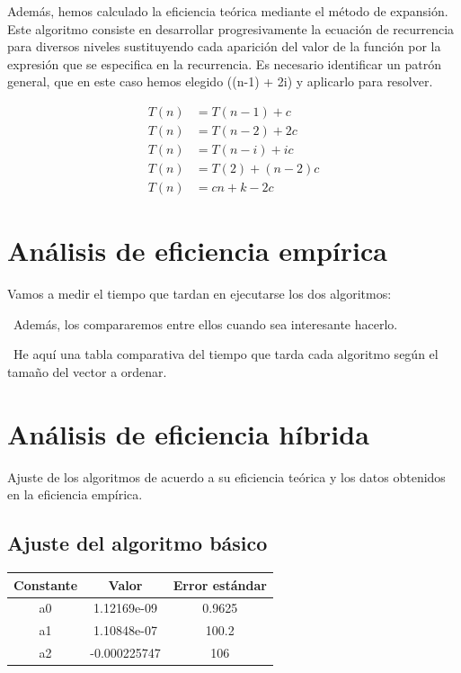 \documentclass{article}
\begin{document}
	Además, hemos calculado la eficiencia teórica mediante el método de expansión. Este algoritmo consiste en desarrollar progresivamente la ecuación de recurrencia para diversos niveles sustituyendo cada aparición del valor de la función por la expresión que se especifica en la recurrencia. Es necesario identificar un patrón general, que en este caso hemos elegido ((n-1) + 2i) y aplicarlo para resolver.
	

\begin{align*}
	T(n) &= T(n-1) + c \\
	T(n) &= T(n-2) + 2c \\
	T(n) &= T(n-i) + ic \\
	T(n) &= T(2) + (n-2)c \\
	T(n) &= cn + k - 2c
\end{align*}
	\section{Análisis de eficiencia empírica}
	Vamos a medir el tiempo que tardan en ejecutarse los dos algoritmos:
	
	\
	Además, los compararemos entre ellos cuando sea interesante hacerlo.
	
	\
	He aquí una tabla comparativa del tiempo que tarda cada algoritmo según el tamaño del vector a ordenar.
	
	
	\section{Análisis de eficiencia híbrida}
	Ajuste de los algoritmos de acuerdo a su eficiencia teórica y los datos obtenidos en la eficiencia empírica.
	
	\subsection{Ajuste del algoritmo básico}
	
	\begin{longtable}{|c|c|c|}
		\hline
		Constante		& Valor			& Error estándar	\\ \hline
		a0              & 1.12169e-09	& 0.9625 \\ \hline
		a1              & 1.10848e-07	& 100.2	 \\ \hline
		a2              & -0.000225747	& 106	 \\ \hline
	\end{longtable}
	
\end{document}
